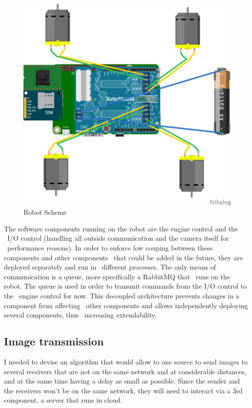 \begin{figure}[ht]
    \label{fig:robot-scheme}
    \includegraphics[keepaspectratio]{img/land-drone-bb.png}
    \caption{Robot Scheme}
\end{figure}

The software components running on the robot are the engine control and the \
I/O control (handling all outside communication and the camera itself for \
performance reasons).
In order to enforce low couping between these components and other components \
that could be added in the future, they are deployed separately and run in \
different processes.
The only means of communication is a queue, more specifically a RabbitMQ that \
runs on the robot.
The queue is used in order to transmit commands from the I/O control to the \
engine control for now.
This decoupled architecture prevents changes in a component from affecting \
other components and allows independently deploying several components, thus \
increasing extendability.


\subsection{Image transmission}
\label{subsec:analysis-image-transmission}
 I needed to devise an algorithm that would allow to one source to send images to several receivers that are
 not on the same network and at considerable distances, and at the same time having a delay as small as possible.
 Since the sender and the receivers won't be on the same network, they will need to interact via a 3rd component,
 a server that runs in cloud.

